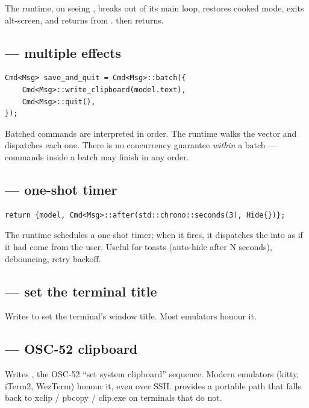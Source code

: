 The runtime, on seeing , breaks out of its main loop,
restores cooked mode, exits alt-screen, and returns from
.  then returns.

\subsection{ --- multiple effects}

\begin{lstlisting}
Cmd<Msg> save_and_quit = Cmd<Msg>::batch({
    Cmd<Msg>::write_clipboard(model.text),
    Cmd<Msg>::quit(),
});
\end{lstlisting}

Batched commands are interpreted in order. The runtime walks the
vector and dispatches each one. There is no concurrency guarantee
\emph{within} a batch ---  commands inside a batch may
finish in any order.

\subsection{ --- one-shot timer}

\begin{lstlisting}
return {model, Cmd<Msg>::after(std::chrono::seconds(3), Hide{})};
\end{lstlisting}

The runtime schedules a one-shot timer; when it fires, it dispatches
the   into  as if it had come
from the user. Useful for toasts (auto-hide after N seconds), debouncing,
retry backoff.

\subsection{ --- set the terminal title}

Writes \code{ESC]0;\emph{title}ESC\textbackslash} to set the
terminal's window title. Most emulators honour it.

\subsection{ --- OSC-52 clipboard}

Writes \code{ESC]52;c;\emph{base64}ESC\textbackslash}, the OSC-52
``set system clipboard'' sequence. Modern emulators (kitty, iTerm2,
WezTerm) honour it, even over SSH. \maya{} provides a portable
path that falls back to xclip / pbcopy / clip.exe on terminals
that do not.

